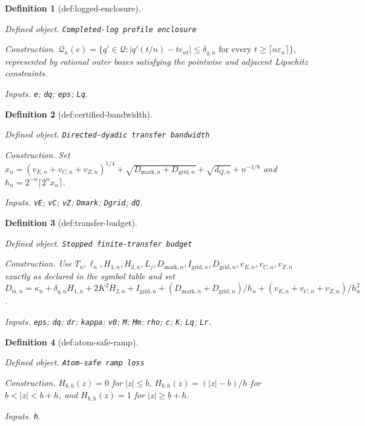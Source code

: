\documentclass{article}
\newtheorem{definition}{Definition}
\begin{document}
\begin{definition}[def:logged-enclosure]\label{def:logged-enclosure}
\par\smallskip\noindent\emph{Defined object.} \texttt{Completed-\allowbreak{}log profile enclosure}
\par\smallskip\noindent\emph{Construction.} \(\mathcal Q_n(e)=\{q'\in\mathcal Q:|q'(t/n)-t e_{nt}|\le\delta_{q,n}\text{ for every }t\ge\lceil n\varepsilon_n\rceil\}\), represented by rational outer boxes satisfying the pointwise and adjacent Lipschitz constraints.
\par\smallskip\noindent\emph{Inputs.} \texttt{e}; \texttt{dq}; \texttt{eps}; \texttt{Lq}.
\end{definition}

\begin{definition}[def:certified-bandwidth]\label{def:certified-bandwidth}
\par\smallskip\noindent\emph{Defined object.} \texttt{Directed-\allowbreak{}dyadic transfer bandwidth}
\par\smallskip\noindent\emph{Construction.} Set \(x_n=(v_{E,n}+v_{C,n}+v_{Z,n})^{1/4}+\sqrt{D_{\mathrm{mark},n}+D_{\mathrm{grid},n}}+\sqrt{d_{Q,n}}+n^{-1/8}\) and \(h_n=2^{-n}\lceil2^n x_n\rceil\).
\par\smallskip\noindent\emph{Inputs.} \texttt{vE}; \texttt{vC}; \texttt{vZ}; \texttt{Dmark}; \texttt{Dgrid}; \texttt{dQ}.
\end{definition}

\begin{definition}[def:transfer-budget]\label{def:transfer-budget}
\par\smallskip\noindent\emph{Defined object.} \texttt{Stopped finite-\allowbreak{}transfer budget}
\par\smallskip\noindent\emph{Construction.} Use \(T_n,\ell_n,H_{1,n},H_{2,n},L_j,D_{\mathrm{mark},n},I_{\mathrm{grid},n},D_{\mathrm{grid},n},v_{E,n},v_{C,n},v_{Z,n}\) exactly as declared in the symbol table and set \(D_{\mathrm{tr},n}=\kappa_n+\delta_{q,n}H_{1,n}+2K^2H_{2,n}+I_{\mathrm{grid},n}+(D_{\mathrm{mark},n}+D_{\mathrm{grid},n})/h_n+(v_{E,n}+v_{C,n}+v_{Z,n})/h_n^2\).
\par\smallskip\noindent\emph{Inputs.} \texttt{eps}; \texttt{dq}; \texttt{dr}; \texttt{kappa}; \texttt{v0}; \texttt{M}; \texttt{Mm}; \texttt{rho}; \texttt{c}; \texttt{K}; \texttt{Lq}; \texttt{Lr}.
\end{definition}

\begin{definition}[def:atom-safe-ramp]\label{def:atom-safe-ramp}
\par\smallskip\noindent\emph{Defined object.} \texttt{Atom-\allowbreak{}safe ramp loss}
\par\smallskip\noindent\emph{Construction.} \(H_{b,h}(z)=0\) for \(|z|\le b\), \(H_{b,h}(z)=(|z|-b)/h\) for \(b<|z|<b+h\), and \(H_{b,h}(z)=1\) for \(|z|\ge b+h\).
\par\smallskip\noindent\emph{Inputs.} \texttt{h}.
\end{definition}
\end{document}
